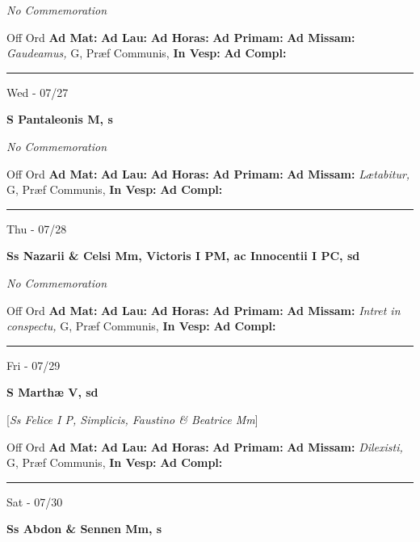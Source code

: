 \documentclass[letterpaper, 10pt]{article}
\begin{document}
\textit{No Commemoration}\begin{justify}
Off Ord
\textbf{Ad Mat: }
\textbf{Ad Lau: }
\textbf{Ad Horas: }
\textbf{Ad Primam: }
\textbf{Ad Missam:} \textit{Gaudeamus, } G, Præf Communis, 
\textbf{In Vesp: }
\textbf{Ad Compl: }\end{justify}



\hrule
\begin{center}
Wed - 07/27
\end{center}\textbf{ \large S Pantaleonis M, \textnormal{\normalsize s}}

\textit{No Commemoration}\begin{justify}
Off Ord
\textbf{Ad Mat: }
\textbf{Ad Lau: }
\textbf{Ad Horas: }
\textbf{Ad Primam: }
\textbf{Ad Missam:} \textit{Lætabitur, } G, Præf Communis, 
\textbf{In Vesp: }
\textbf{Ad Compl: }\end{justify}



\hrule
\begin{center}
Thu - 07/28
\end{center}\textbf{ \large Ss Nazarii \& Celsi Mm, Victoris I PM, ac Innocentii I PC, \textnormal{\normalsize sd}}

\textit{No Commemoration}\begin{justify}
Off Ord
\textbf{Ad Mat: }
\textbf{Ad Lau: }
\textbf{Ad Horas: }
\textbf{Ad Primam: }
\textbf{Ad Missam:} \textit{Intret in conspectu, } G, Præf Communis, 
\textbf{In Vesp: }
\textbf{Ad Compl: }\end{justify}



\hrule
\begin{center}
Fri - 07/29
\end{center}\textbf{ \large S Marthæ V, \textnormal{\normalsize sd}}

[\textit{Ss Felice I P, Simplicis, Faustino \& Beatrice Mm}]
\begin{justify}
Off Ord
\textbf{Ad Mat: }
\textbf{Ad Lau: }
\textbf{Ad Horas: }
\textbf{Ad Primam: }
\textbf{Ad Missam:} \textit{Dilexisti, } G, Præf Communis, 
\textbf{In Vesp: }
\textbf{Ad Compl: }\end{justify}



\hrule
\begin{center}
Sat - 07/30
\end{center}\textbf{ \large Ss Abdon \& Sennen Mm, \textnormal{\normalsize s}}
\end{document}
